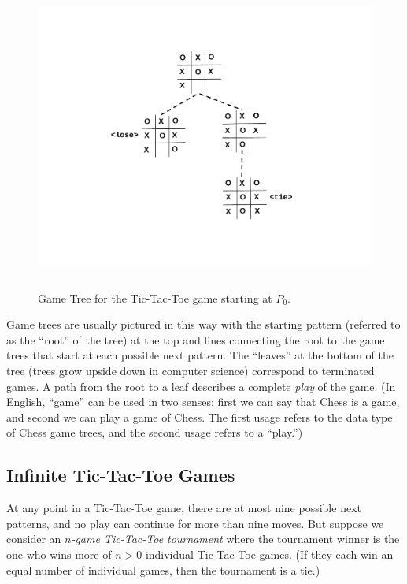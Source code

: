 \begin{definition}
\begin{figure}[htbp]
\centering
\includegraphics[height=4in]{figures/endgame.pdf}
\caption{Game Tree for the Tic-Tac-Toe game starting at $P_0$.}
\label{fig:endgame}
\end{figure}

Game trees are usually pictured in this way with the starting pattern
(referred to as the ``root'' of the tree) at the top and lines connecting
the root to the game trees that start at each
possible next pattern.  The ``leaves'' at the bottom of the tree (trees
grow upside down in computer science) correspond to terminated games.  A
path from the root to a leaf describes a complete \emph{play} of the game.
(In English, ``game'' can be used in two senses: first we can say that
Chess is a game, and second we can play a game of Chess.  The first usage
refers to the data type of Chess game trees, and the second usage refers to
a ``play.'')

\subsection{Infinite Tic-Tac-Toe Games}

At any point in a Tic-Tac-Toe game, there are at most nine possible next
patterns, and no play can continue for more than nine moves.  But suppose
we consider an \emph{$n$-game Tic-Tac-Toe tournament} where the tournament
winner is the one who wins more of $n>0$ individual Tic-Tac-Toe games.  (If
they each win an equal number of individual games, then the tournament is a
tie.)


\end{definition}
